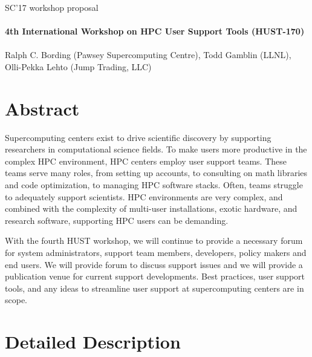 \documentclass[a4paper,10pt]{article}
\begin{document}
\begin{center}
    \Large{SC'17 workshop proposal}\\~\\
    \large{\textbf{4th International Workshop on HPC User Support Tools (HUST-170)}}\\~\\
    \normalsize{Ralph C. Bording (Pawsey Supercomputing Centre), Todd Gamblin (LLNL),\\
    Olli-Pekka Lehto (Jump Trading, LLC)}
\end{center}

\section*{Abstract}
\label{sec:abstract}

Supercomputing centers exist to drive scientific discovery by supporting researchers in 
computational science fields.  To make users more productive in the complex HPC
environment, HPC centers employ user support teams.  These teams
serve many roles, from setting up accounts, to consulting on math libraries and code
optimization, to managing HPC software stacks.
Often, teams struggle to adequately support scientists.
HPC environments are very complex, and combined with
the complexity of multi-user installations, exotic hardware, and
research software, supporting HPC users can be demanding.

With the fourth HUST workshop, we will continue to provide a necessary forum for 
system administrators, support team members, developers, policy makers and
end users.  We will provide forum to discuss support issues and we will
provide a publication venue for current support developments.  Best practices,
user support tools, and any ideas to streamline user support at supercomputing
centers are in scope.


\section*{Detailed Description}
\label{sec:detailed}
\end{document}
